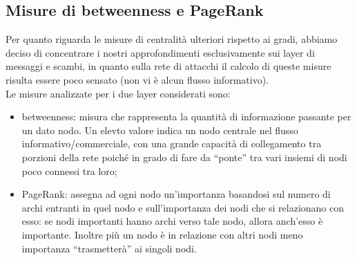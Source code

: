 \newpage
\subsection{Misure di betweenness e PageRank}
\label{subsec:centrality}
Per quanto riguarda le misure di centralità ulteriori rispetto ai gradi, abbiamo deciso di concentrare i nostri approfondimenti esclusivamente sui layer di messaggi e scambi, in quanto sulla rete di attacchi il calcolo di queste misure risulta essere poco sensato (non vi è alcun flusso informativo).\\
Le misure analizzate per i due layer considerati sono:
\begin{itemize}
	\item betweenness: misura che rappresenta la quantità di informazione passante per un dato nodo. Un elevto valore indica un nodo centrale nel flusso informativo/commerciale, con una grande capacità di collegamento tra porzioni della rete poiché in grado di fare da “ponte” tra vari insiemi di nodi poco connessi tra loro;
	\item PageRank: assegna ad ogni nodo un'importanza basandosi sul numero di archi entranti in quel nodo e sull'importanza dei nodi che si relazionano con esso: se nodi importanti hanno archi verso tale nodo, allora anch'esso è importante. Inoltre più un nodo è in relazione con altri nodi meno importanza “trasmetterà” ai singoli nodi.
\end{itemize}

